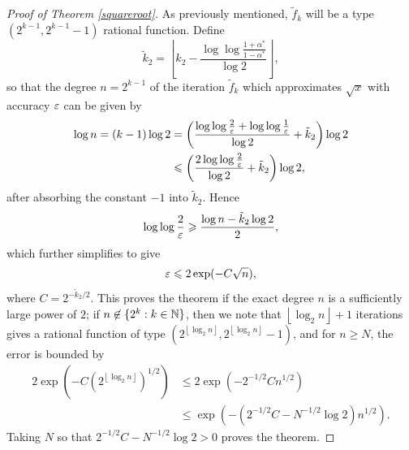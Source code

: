 \begin{appendices}
\begin{proof}[Proof of Theorem \ref{squareroot}]
As previously mentioned, $\tilde{f}_k$ will be a type $(2^{k-1},2^{k-1}-1)$ rational function. Define 
\[\tilde{k}_2=\left\lfloor k_2-\frac{\log\log \frac{1+\alpha^*}{1-\alpha^*}}{\log 2}\right\rfloor,\]
so that the degree $n=2^{k-1}$ of the iteration $\tilde{f}_k$ which approximates $\sqrt{x}$ with accuracy $\varepsilon$ can be given by
\begin{align*}
    \log n= (k-1)\log 2 &= \left(\dfrac{\log\log\frac{2}{\varepsilon}+\log\log\frac{1}{\varepsilon}}{\log 2}+\tilde{k}_2\right)\log 2\\
    & \leqslant \left(\dfrac{2\log\log\frac{2}{\varepsilon}}{\log 2}+\tilde{k}_2\right)\log 2,
\end{align*}
after absorbing the constant $-1$ into $\tilde{k}_2$. Hence
\[\log\log \dfrac{2}{\varepsilon}\geqslant \dfrac{\log n - \tilde{k}_2 \log 2}{2},\]
which further simplifies to give
\[\varepsilon \leqslant 2\exp(-C\sqrt{n}),\]
where $C = 2^{-\tilde{k}_2/2}$. This proves the theorem if the exact degree $n$ is a sufficiently large power of $2$; if $n \not\in \{2^k : k\in \mathbb{N}\}$, then we note that $\left\lfloor \log_2 n\right\rfloor +1$ iterations gives a rational function of type $(2^{\left\lfloor \log_2 n\right\rfloor},2^{\left\lfloor \log_2 n\right\rfloor}-1)$, and for $n \geq N$, the error is bounded by
\begin{align*}
    2\exp(-C(2^{\left\lfloor \log_2 n\right\rfloor})^{1/2}) &\leq 2\exp(-2^{-1/2}Cn^{1/2})\\
    &\leq \exp(-(2^{-1/2}C-N^{-1/2}\log 2)n^{1/2}).
\end{align*}
Taking $N$ so that $2^{-1/2}C-N^{-1/2}\log 2>0$ proves the theorem.
\end{proof}

\end{appendices}